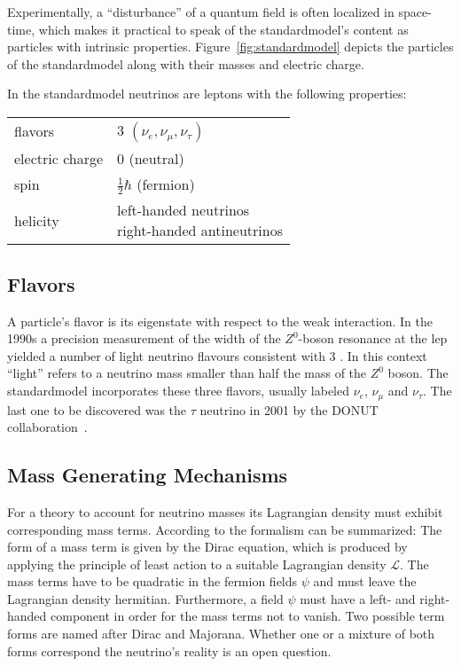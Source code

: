     Experimentally, a ``disturbance'' of a quantum field is often localized in space-time, which makes it practical to speak of the \gls{standardmodel}'s content as particles with intrinsic properties. Figure~\ref{fig:standardmodel} depicts the particles of the \gls{standardmodel} along with their masses and electric charge.
    
    In the \gls{standardmodel} neutrinos are leptons with the following properties:~
    \begin{center}
    \begin{tabular}{ll}
        \toprule
        flavors & 3 $(\nu_e, \nu_\mu, \nu_\tau)$ \\
        electric charge & 0 (neutral) \\
        spin & $\frac{1}{2} \hbar$ (fermion) \\
        helicity & \makecell[lt]{left-handed neutrinos \\ right-handed antineutrinos} \\
        \bottomrule
    \end{tabular}
    \end{center}
    
    \subsection{Flavors}
    A particle's flavor is its eigenstate with respect to the weak interaction. In the 1990s a precision measurement of the width of the $Z^0$-boson resonance at the \gls{lep} yielded a number of light neutrino flavours consistent with 3 \cite{NumberOfNeutrinos}. In this context ``light'' refers to a neutrino mass smaller than half the mass of the $Z^0$ boson. The \gls{standardmodel} incorporates these three flavors, usually labeled $\nu_e$, $\nu_\mu$ and $\nu_\tau$. The last one to be discovered was the $\tau$ neutrino in 2001 by the DONUT collaboration~\cite{Kodama2000}.
    
    \subsection{Mass Generating Mechanisms}
    For a theory to account for neutrino masses its Lagrangian density must exhibit corresponding mass terms. According to \cite{zuber2011neutrino} the formalism can be summarized: The form of a mass term is given by the Dirac equation, which is produced by applying the principle of least action to a suitable Lagrangian density $\mathcal{L}$. The mass terms have to be quadratic in the fermion fields $\psi$ and must leave the Lagrangian density hermitian. Furthermore, a field $\psi$ must have a left- and right-handed component in order for the mass terms not to vanish. Two possible term forms are named after Dirac and Majorana. Whether one or a mixture of both forms correspond the neutrino's reality is an open question.
    
